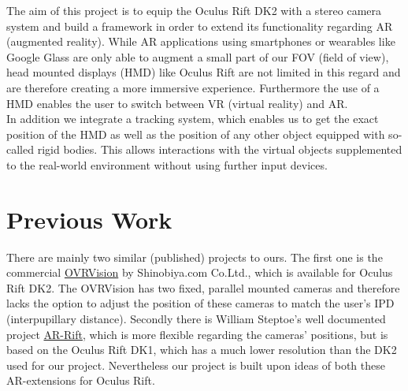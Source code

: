 The aim of this project is to equip the Oculus Rift DK2 with a stereo camera system and build a framework in order to extend its functionality regarding AR (augmented reality). While AR applications using smartphones or wearables like Google Glass are only able to augment a small part of our FOV (field of view), head mounted displays (HMD) like Oculus Rift are not limited in this regard and are therefore creating a more immersive experience. Furthermore the use of a HMD enables the user to switch between VR (virtual reality) and AR.\\
In addition we integrate a tracking system, which enables us to get the exact position of the HMD as well as the position of any other object equipped with so-called rigid bodies. This allows interactions with the virtual objects supplemented to the real-world environment without using further input devices.

\section*{Previous Work}
There are mainly two similar (published) projects to ours. The first one is the commercial \href{http://ovrvision.com/}{OVRVision} by Shinobiya.com Co.Ltd., which is available for Oculus Rift DK2. The OVRVision has two fixed, parallel mounted cameras and therefore lacks the option to adjust the position of these cameras to match the user's IPD (interpupillary distance). Secondly there is William Steptoe's well documented project \href{http://willsteptoe.com/post/66968953089/ar-rift-part-1}{AR-Rift}, which is more flexible regarding the cameras' positions, but is based on the Oculus Rift DK1, which has a much lower resolution than the DK2 used for our project. Nevertheless our project is built upon ideas of both these AR-extensions for Oculus Rift.